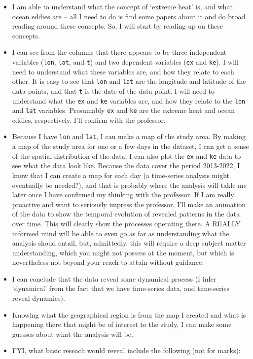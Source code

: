 \documentclass[
  10t,
]{article}
\providecommand{\tightlist}{%
  \setlength{\itemsep}{0pt}\setlength{\parskip}{0pt}}
\let\oldtexttt\texttt
\renewcommand{\texttt}[1]{\oldtexttt{\small #1}}
\begin{document}
\begin{itemize}
\tightlist
\item
  I am able to understand what the concept of `extreme heat' is, and
  what ocean eddies are -- all I need to do is find some papers about it
  and do broad reading around these concepts. So, I will start by
  reading up on these concepts.
\item
  I can see from the columns that there appears to be three independent
  variables (\texttt{lon}, \texttt{lat}, and \texttt{t}) and two
  dependent variables (\texttt{ex} and \texttt{ke}). I will need to
  understand what these variables are, and how they relate to each
  other. It is easy to see that \texttt{lon} and \texttt{lat} are the
  longitude and latitude of the data points, and that \texttt{t} is the
  date of the data point. I will need to understand what the \texttt{ex}
  and \texttt{ke} variables are, and how they relate to the \texttt{lon}
  and \texttt{lat} variables. Presumably \texttt{ex} and \texttt{ke} are
  the extreme heat and ocean eddies, respectively. I'll confirm with the
  professor.
\item
  Because I have \texttt{lon} and \texttt{lat}, I can make a map of the
  study area. By making a map of the study area for one or a few days in
  the dataset, I can get a sense of the spatial distribution of the
  data. I can also plot the \texttt{ex} and \texttt{ke} data to see what
  the data look like. Because the data cover the period 2013-2022, I
  know that I can create a map for each day (a time-series analysis
  might eventually be needed?), and that is probably where the analysis
  will takle me later once I have confirmed my thinking with the
  professor. If I am really proactive and want to seriously impress the
  professor, I'll make an animation of the data to show the temporal
  evolution of revealed patterns in the data over time. This will
  clearly show the processes operating there. A REALLY informed mind
  will be able to even go as far as understanding what the analysis
  shoud entail, but, admittedly, this will require a deep subject matter
  understanding, which you might not possess at the moment, but which is
  nevertheless not beyond your reach to attain without guidance.
\item
  I can conclude that the data reveal some dynamical process (I infer
  `dynamical' from the fact that we have time-series data, and
  time-series reveal dynamics).
\item
  Knowing what the geographical region is from the map I created and
  what is happening there that might be of interest to the study, I can
  make some guesses about what the analysis will be.
\item
  FYI, what basic reseach would reveal include the following (not for
  marks):


\end{itemize}
\end{document}

